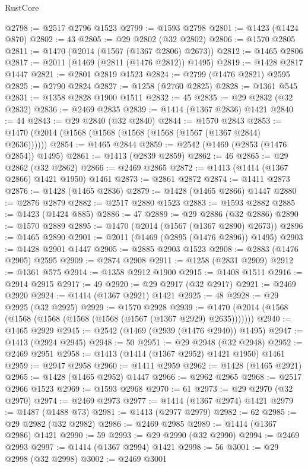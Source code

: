 \begin{lexlean}{RustCore}
\begin{coremodule}
@2798 := @2517 @2796 @1523
@2799 := @1593 @2798
@2801 := @1423 (@1424 @870)
@2802 := 43
@2805 := @29 @2802 (@32 @2802)
@2806 := @1570 @2805
@2811 := @1470 (@2014 (@1567 (@1367 @2806) @2673))
@2812 := @1465 @2806
@2817 := @2011 (@1469 (@2811 (@1476 @2812)) @1495)
@2819 := @1428 @2817 @1447
@2821 := @2801 @2819 @1523
@2824 := @2799 (@1476 @2821) @2595
@2825 := @2790 @2824
@2827 := @1258 (@2760 @2825)
@2828 := @1361 @545
@2831 := @1358 @2828 @1900 @1511
@2832 := 45
@2835 := @29 @2832 (@32 @2832)
@2836 := @2469 @2835
@2839 := @1414 (@1367 @2836) @1421
@2840 := 44
@2843 := @29 @2840 (@32 @2840)
@2844 := @1570 @2843
@2853 := @1470 (@2014 (@1568 (@1568 (@1568 (@1568 (@1567 (@1367 @2844) @2636))))))
@2854 := @1465 @2844
@2859 := @2542 (@1469 (@2853 (@1476 @2854)) @1495)
@2861 := @1413 (@2839 @2859)
@2862 := 46
@2865 := @29 @2862 (@32 @2862)
@2866 := @2469 @2865
@2872 := @1413 (@1414 (@1367 @2866) @1421 @1950) @1461
@2873 := @2861 @2872
@2874 := @1411 @2873
@2876 := @1428 (@1465 @2836)
@2879 := @1428 (@1465 @2866) @1447
@2880 := @2876 @2879
@2882 := @2517 @2880 @1523
@2883 := @1593 @2882
@2885 := @1423 (@1424 @885)
@2886 := 47
@2889 := @29 @2886 (@32 @2886)
@2890 := @1570 @2889
@2895 := @1470 (@2014 (@1567 (@1367 @2890) @2673))
@2896 := @1465 @2890
@2901 := @2011 (@1469 (@2895 (@1476 @2896)) @1495)
@2903 := @1428 @2901 @1447
@2905 := @2885 @2903 @1523
@2908 := @2883 (@1476 @2905) @2595
@2909 := @2874 @2908
@2911 := @1258 (@2831 @2909)
@2912 := @1361 @575
@2914 := @1358 @2912 @1900
@2915 := @1408 @1511
@2916 := @2914 @2915
@2917 := 49
@2920 := @29 @2917 (@32 @2917)
@2921 := @2469 @2920
@2924 := @1414 (@1367 @2921) @1421
@2925 := 48
@2928 := @29 @2925 (@32 @2925)
@2929 := @1570 @2928
@2939 := @1470 (@2014 (@1568 (@1568 (@1568 (@1568 (@1568 (@1567 (@1367 @2929) @2635)))))))
@2940 := @1465 @2929
@2945 := @2542 (@1469 (@2939 (@1476 @2940)) @1495)
@2947 := @1413 (@2924 @2945)
@2948 := 50
@2951 := @29 @2948 (@32 @2948)
@2952 := @2469 @2951
@2958 := @1413 (@1414 (@1367 @2952) @1421 @1950) @1461
@2959 := @2947 @2958
@2960 := @1411 @2959
@2962 := @1428 (@1465 @2921)
@2965 := @1428 (@1465 @2952) @1447
@2966 := @2962 @2965
@2968 := @2517 @2966 @1523
@2969 := @1593 @2968
@2970 := 61
@2973 := @29 @2970 (@32 @2970)
@2974 := @2469 @2973
@2977 := @1414 (@1367 @2974) @1421
@2979 := @1487 (@1488 @73)
@2981 := @1413 (@2977 @2979)
@2982 := 62
@2985 := @29 @2982 (@32 @2982)
@2986 := @2469 @2985
@2989 := @1414 (@1367 @2986) @1421
@2990 := 59
@2993 := @29 @2990 (@32 @2990)
@2994 := @2469 @2993
@2997 := @1414 (@1367 @2994) @1421
@2998 := 56
@3001 := @29 @2998 (@32 @2998)
@3002 := @2469 @3001

\end{coremodule}
\end{lexlean}
